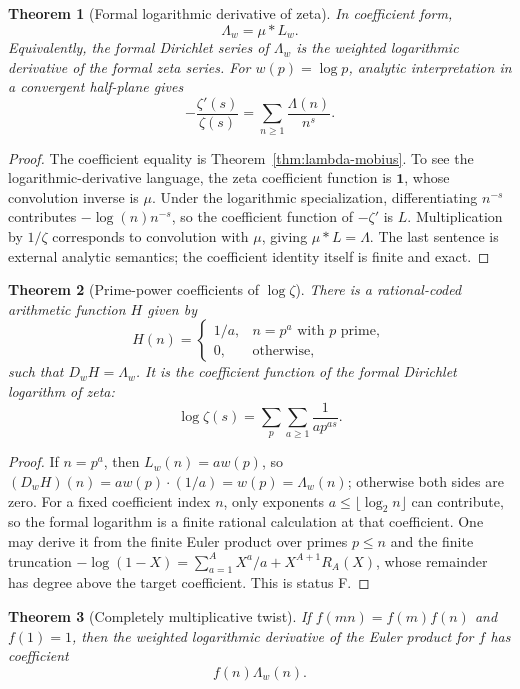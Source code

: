 \documentclass[11pt]{article}
\newtheorem{theorem}{Theorem}[section]
\theoremstyle{definition}
\newcommand{\StatusF}{\textsf{F}}
\begin{document}
\begin{theorem}[Formal logarithmic derivative of zeta]\label{thm:zeta-logder}
In coefficient form,
\[
 \boxed{\Lambda_w=\mu*L_w.}
\]
Equivalently, the formal Dirichlet series of \(\Lambda_w\) is the weighted
logarithmic derivative of the formal zeta series.  For
\(w(p)=\log p\), analytic interpretation in a convergent half-plane gives
\[
 -\frac{\zeta'(s)}{\zeta(s)}
 =\sum_{n\ge1}\frac{\Lambda(n)}{n^s}.
\]
\end{theorem}

\begin{proof}
The coefficient equality is Theorem~\ref{thm:lambda-mobius}.  To see the
logarithmic-derivative language, the zeta coefficient function is
\(\mathbf1\), whose convolution inverse is \(\mu\).  Under the logarithmic
specialization, differentiating \(n^{-s}\) contributes
\(-\log(n)n^{-s}\), so the coefficient function of \(-\zeta'\) is \(L\).
Multiplication by \(1/\zeta\) corresponds to convolution with \(\mu\), giving
\(\mu*L=\Lambda\).  The last sentence is external analytic semantics; the
coefficient identity itself is finite and exact.
\end{proof}

\begin{theorem}[Prime-power coefficients of \(\log\zeta\)]\label{thm:log-zeta-coeff}
There is a rational-coded arithmetic function \(H\) given by
\[
 H(n)=\begin{cases}1/a,&n=p^a\text{ with }p\text{ prime},\\0,&\text{otherwise},\end{cases}
\]
such that \(D_wH=\Lambda_w\).  It is the coefficient function of the formal
Dirichlet logarithm of zeta:
\[
 \log\zeta(s)=\sum_p\sum_{a\ge1}\frac1{a p^{as}}.
\]
\end{theorem}

\begin{proof}
If \(n=p^a\), then \(L_w(n)=aw(p)\), so
\((D_wH)(n)=aw(p)\cdot(1/a)=w(p)=\Lambda_w(n)\); otherwise both sides are
zero.  For a fixed coefficient index \(n\), only exponents
\(a\le\lfloor\log_2 n\rfloor\) can contribute, so the formal logarithm is a
finite rational calculation at that coefficient.  One may derive it from the
finite Euler product over primes \(p\le n\) and the finite truncation
\(-\log(1-X)=\sum_{a=1}^{A}X^a/a+X^{A+1}R_A(X)\), whose remainder has degree
above the target coefficient.  This is status \StatusF.
\end{proof}

\begin{theorem}[Completely multiplicative twist]\label{thm:twist}
If \(f(mn)=f(m)f(n)\) and \(f(1)=1\), then the weighted logarithmic derivative
of the Euler product for \(f\) has coefficient
\[
 \boxed{f(n)\Lambda_w(n).}
\]
\end{theorem}
\end{document}
